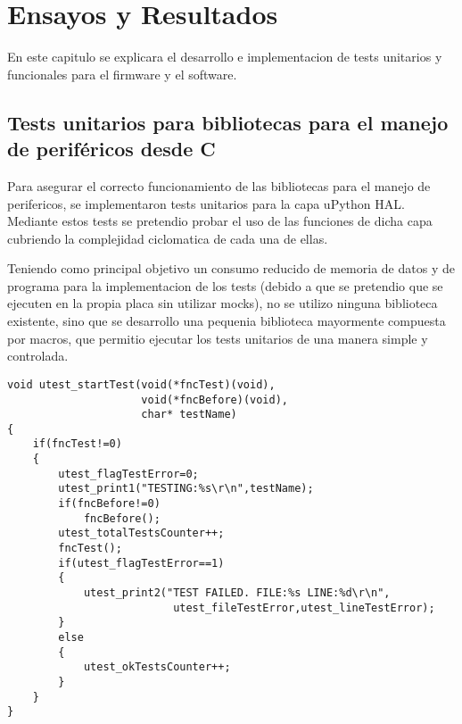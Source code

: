 
\chapter{Ensayos y Resultados} %
En este capitulo se explicara el desarrollo e implementacion de tests unitarios y funcionales para el firmware y el software.

\label{Chapter4} %


\section{Tests unitarios para bibliotecas para el manejo de periféricos desde C}
\label{sec:testUnitariosC}

Para asegurar el correcto funcionamiento de las bibliotecas para el manejo de perifericos, se implementaron tests unitarios para la capa uPython HAL. Mediante estos tests se pretendio probar el uso de las funciones de dicha capa cubriendo la complejidad ciclomatica de cada una de ellas.

Teniendo como principal objetivo un consumo reducido de memoria de datos y de programa para la implementacion de los tests (debido a que se pretendio que se ejecuten en la propia placa sin utilizar mocks), no se utilizo ninguna biblioteca existente, sino que se desarrollo una pequenia biblioteca mayormente compuesta por macros, que permitio ejecutar los tests unitarios de una manera simple y controlada.


\begin{lstlisting}[label={lst:utest},caption=Función que ejecuta un test unitario incluida en el archivo utest.c del firmware.]
void utest_startTest(void(*fncTest)(void),
                     void(*fncBefore)(void),
                     char* testName)
{
	if(fncTest!=0)
	{
		utest_flagTestError=0;
		utest_print1("TESTING:%s\r\n",testName);
		if(fncBefore!=0)
			fncBefore();
		utest_totalTestsCounter++;
		fncTest();
		if(utest_flagTestError==1)
		{
			utest_print2("TEST FAILED. FILE:%s LINE:%d\r\n",
			              utest_fileTestError,utest_lineTestError);
		}
		else
		{
			utest_okTestsCounter++;
		}
	}
} 
\end{lstlisting}

